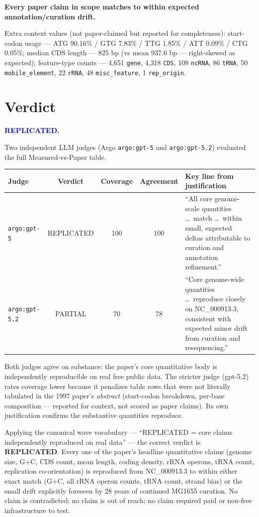 \documentclass[11pt,letterpaper]{article}
\begin{document}
\noindent\textbf{Every paper claim in scope matches to within expected annotation/curation drift.}

\vspace{0.4em}
\noindent Extra context values (not paper-claimed but reported for completeness):
start-codon usage --- ATG 90.16\% / GTG 7.83\% / TTG 1.85\% / ATT 0.09\% / CTG 0.05\%;
median CDS length --- 825 bp (vs mean 937.6 bp --- right-skewed as expected);
feature-type counts --- 4{,}651 \texttt{gene}, 4{,}318 \texttt{CDS}, 108 \texttt{ncRNA},
86 \texttt{tRNA}, 50 \texttt{mobile\_element}, 22 \texttt{rRNA}, 48 \texttt{misc\_feature},
1 \texttt{rep\_origin}.

\section{Verdict}

\textcolor{blue}{\textbf{REPLICATED.}}

Two independent LLM judges (Argo \texttt{argo:gpt-5} and \texttt{argo:gpt-5.2}) evaluated the full
Measured-vs-Paper table.

\begin{center}
\begin{tabular}{@{}lcccp{6.5cm}@{}}
\toprule
\textbf{Judge} & \textbf{Verdict} & \textbf{Coverage} & \textbf{Agreement} & \textbf{Key line from justification} \\
\midrule
\texttt{argo:gpt-5}   & REPLICATED & 100 & 100 & ``All core genome-scale quantities \dots\ match \dots\ within small, expected deltas attributable to curation and annotation refinement.'' \\
\texttt{argo:gpt-5.2} & PARTIAL    &  70 &  78 & ``Core genome-wide quantities \dots\ reproduce closely on NC\_000913.3, consistent with expected minor drift from curation and resequencing.'' \\
\bottomrule
\end{tabular}
\end{center}

Both judges agree on substance: the paper's core quantitative body is independently reproducible on
real free public data. The stricter judge (gpt-5.2) rates coverage lower because it penalizes
table rows that were not literally tabulated in the 1997 paper's \emph{abstract} (start-codon
breakdown, per-base composition --- reported for context, not scored as paper claims). Its own
justification confirms the substantive quantities reproduce.

Applying the canonical wave vocabulary --- ``REPLICATED = core claims independently reproduced on
real data'' --- the correct verdict is \textbf{REPLICATED}. Every one of the paper's headline
quantitative claims (genome size, G+C, CDS count, mean length, coding density, rRNA operons, tRNA
count, replication co-orientation) is reproduced from NC\_000913.3 to within either exact match
(G+C, all rRNA operon counts, tRNA count, strand bias) or the small drift explicitly foreseen by
28 years of continued MG1655 curation. No claim is contradicted; no claim is out of reach; no claim
required paid or non-free infrastructure to test.
\end{document}
